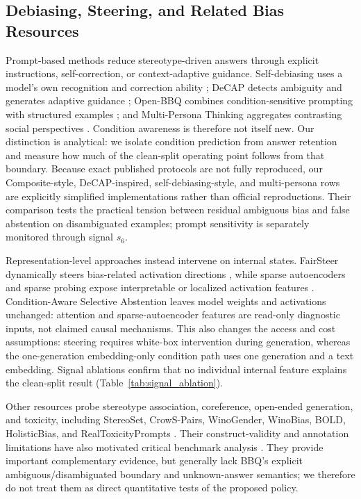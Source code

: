 \documentclass{ieeeaccess}
\newcommand{\method}{Condition-Aware Selective Abstention}
\begin{document}
\subsection{Debiasing, Steering, and Related Bias Resources}
Prompt-based methods reduce stereotype-driven answers through explicit instructions, self-correction, or context-adaptive guidance. Self-debiasing uses a model's own recognition and correction ability \cite{gallegos2024selfdebiasing}; DeCAP detects ambiguity and generates adaptive guidance \cite{bae2025decap}; Open-BBQ combines condition-sensitive prompting with structured examples \cite{openbias2025}; and Multi-Persona Thinking aggregates contrasting social perspectives \cite{chen2026mpt}. Condition awareness is therefore not itself new. Our distinction is analytical: we isolate condition prediction from answer retention and measure how much of the clean-split operating point follows from that boundary. Because exact published protocols are not fully reproduced, our Composite-style, DeCAP-inspired, self-debiasing-style, and multi-persona rows are explicitly simplified implementations rather than official reproductions. Their comparison tests the practical tension between residual ambiguous bias and false abstention on disambiguated examples; prompt sensitivity is separately monitored through signal $s_6$.

Representation-level approaches instead intervene on internal states. FairSteer dynamically steers bias-related activation directions \cite{li2025fairsteer}, while sparse autoencoders and sparse probing expose interpretable or localized activation features \cite{bricken2023monosemanticity,he2024llamascope,cunningham2023sae,gurnee2023haystack}. \method{} leaves model weights and activations unchanged: attention and sparse-autoencoder features are read-only diagnostic inputs, not claimed causal mechanisms. This also changes the access and cost assumptions: steering requires white-box intervention during generation, whereas the one-generation embedding-only condition path uses one generation and a text embedding. Signal ablations confirm that no individual internal feature explains the clean-split result (Table~\ref{tab:signal_ablation}).

Other resources probe stereotype association, coreference, open-ended generation, and toxicity, including StereoSet, CrowS-Pairs, WinoGender, WinoBias, BOLD, HolisticBias, and RealToxicityPrompts \cite{nadeem2021stereoset,nangia2020crows,rudinger2018gender,zhao2018winobias,dhamala2021bold,smith2022holisticbias,gehman2020realtoxicityprompts}. Their construct-validity and annotation limitations have also motivated critical benchmark analysis \cite{blodgett2021salmon}. They provide important complementary evidence, but generally lack BBQ's explicit ambiguous/disambiguated boundary and unknown-answer semantics; we therefore do not treat them as direct quantitative tests of the proposed policy.
\end{document}
